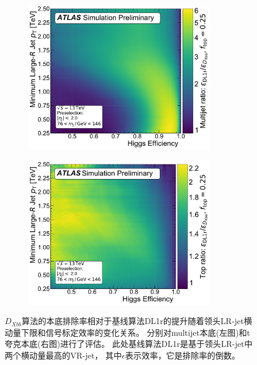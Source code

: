\begin{figure}[!thbp]
  \begin{subfigure}{.5\textwidth}
  \centering
  \includegraphics[width=0.9\textwidth]{figuresXbb/pulled/roc2d/ratio/dl1r/dijet.pdf}
  \caption{}
  \end{subfigure}
  \begin{subfigure}{.5\textwidth}
  \centering
  \includegraphics[width=0.9\textwidth]{figuresXbb/pulled/roc2d/ratio/dl1r/top.pdf}
  \caption{}
  \end{subfigure}
  \caption{
  $D_{Xbb}$算法的本底排除率相对于基线算法DL1r的提升随着领头LR-jet横动量下限和信号标定效率的变化关系。
  分别对multijet本底(左图)和t夸克本底(右图)进行了评估。
  此处基线算法DL1r是基于领头LR-jet中两个横动量最高的VR-jet，
  其中$\epsilon$表示效率，它是排除率的倒数。
  }
\label{fig:PTDL1r}
\end{figure}

